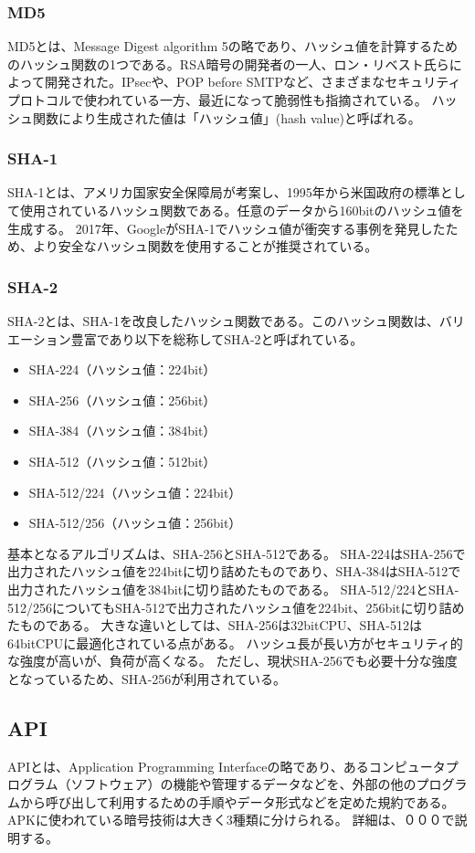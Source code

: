 \subsubsection {MD5}
MD5とは、Message Digest algorithm 5の略であり、ハッシュ値を計算するためのハッシュ関数の1つである。RSA暗号の開発者の一人、ロン・リベスト氏らによって開発された。IPsecや、POP before SMTPなど、さまざまなセキュリティプロトコルで使われている一方、最近になって脆弱性も指摘されている。
ハッシュ関数により生成された値は「ハッシュ値」(hash value)と呼ばれる。

\subsubsection {SHA-1}
SHA-1とは、アメリカ国家安全保障局が考案し、1995年から米国政府の標準として使用されているハッシュ関数である。任意のデータから160bitのハッシュ値を生成する。
2017年、GoogleがSHA-1でハッシュ値が衝突する事例\cite{Google事例}を発見したため、より安全なハッシュ関数を使用することが推奨されている。

\subsubsection{SHA-2}
SHA-2とは、SHA-1を改良したハッシュ関数である。このハッシュ関数は、バリエーション豊富であり以下を総称してSHA-2と呼ばれている。
\begin{itemize}
\item SHA-224（ハッシュ値：224bit）
\item SHA-256（ハッシュ値：256bit）
\item SHA-384（ハッシュ値：384bit）
\item SHA-512（ハッシュ値：512bit）
\item SHA-512/224（ハッシュ値：224bit）
\item SHA-512/256（ハッシュ値：256bit）
\end{itemize}
基本となるアルゴリズムは、SHA-256とSHA-512である。
SHA-224はSHA-256で出力されたハッシュ値を224bitに切り詰めたものであり、SHA-384はSHA-512で出力されたハッシュ値を384bitに切り詰めたものである。
SHA-512/224とSHA-512/256についてもSHA-512で出力されたハッシュ値を224bit、256bitに切り詰めたものである。
大きな違いとしては、SHA-256は32bitCPU、SHA-512は64bitCPUに最適化されている点がある。
ハッシュ長が長い方がセキュリティ的な強度が高いが、負荷が高くなる。
ただし、現状SHA-256でも必要十分な強度となっているため、SHA-256が利用されている。


\subsection{API}
APIとは、Application Programming Interfaceの略であり、あるコンピュータプログラム（ソフトウェア）の機能や管理するデータなどを、外部の他のプログラムから呼び出して利用するための手順やデータ形式などを定めた規約である。
APKに使われている暗号技術は大きく3種類に分けられる。
詳細は、０００で説明する。

